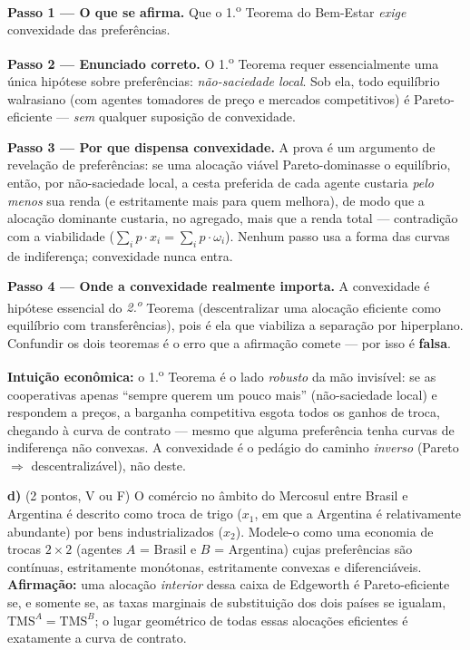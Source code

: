 \begin{solucao}
\textbf{Passo 1 --- O que se afirma.} Que o 1.\textsuperscript{o} Teorema do Bem-Estar \emph{exige} convexidade das preferências.

\textbf{Passo 2 --- Enunciado correto.} O 1.\textsuperscript{o} Teorema requer essencialmente uma única hipótese sobre preferências: \emph{não-saciedade local}. Sob ela, todo equilíbrio walrasiano (com agentes tomadores de preço e mercados competitivos) é Pareto-eficiente --- \emph{sem} qualquer suposição de convexidade.

\textbf{Passo 3 --- Por que dispensa convexidade.} A prova é um argumento de revelação de preferências: se uma alocação viável Pareto-dominasse o equilíbrio, então, por não-saciedade local, a cesta preferida de cada agente custaria \emph{pelo menos} sua renda (e estritamente mais para quem melhora), de modo que a alocação dominante custaria, no agregado, mais que a renda total --- contradição com a viabilidade ($\sum_i p\cdot x_i = \sum_i p\cdot\omega_i$). Nenhum passo usa a forma das curvas de indiferença; convexidade nunca entra.

\textbf{Passo 4 --- Onde a convexidade realmente importa.} A convexidade é hipótese essencial do \emph{2.\textsuperscript{o}} Teorema (descentralizar uma alocação eficiente como equilíbrio com transferências), pois é ela que viabiliza a separação por hiperplano. Confundir os dois teoremas é o erro que a afirmação comete --- por isso é \textbf{falsa}.

\textbf{Intuição econômica:} o 1.\textsuperscript{o} Teorema é o lado \emph{robusto} da mão invisível: se as cooperativas apenas ``sempre querem um pouco mais'' (não-saciedade local) e respondem a preços, a barganha competitiva esgota todos os ganhos de troca, chegando à curva de contrato --- mesmo que alguma preferência tenha curvas de indiferença não convexas. A convexidade é o pedágio do caminho \emph{inverso} (Pareto $\Rightarrow$ descentralizável), não deste.
\end{solucao}

\textbf{d)} (2 pontos, V ou F) O comércio no âmbito do Mercosul entre Brasil e Argentina é descrito como troca de trigo ($x_1$, em que a Argentina é relativamente abundante) por bens industrializados ($x_2$). Modele-o como uma economia de trocas $2\times 2$ (agentes $A$ = Brasil e $B$ = Argentina) cujas preferências são contínuas, estritamente monótonas, estritamente convexas e diferenciáveis. \textbf{Afirmação:} uma alocação \emph{interior} dessa caixa de Edgeworth é Pareto-eficiente se, e somente se, as taxas marginais de substituição dos dois países se igualam, $\text{TMS}^A = \text{TMS}^B$; o lugar geométrico de todas essas alocações eficientes é exatamente a curva de contrato.

